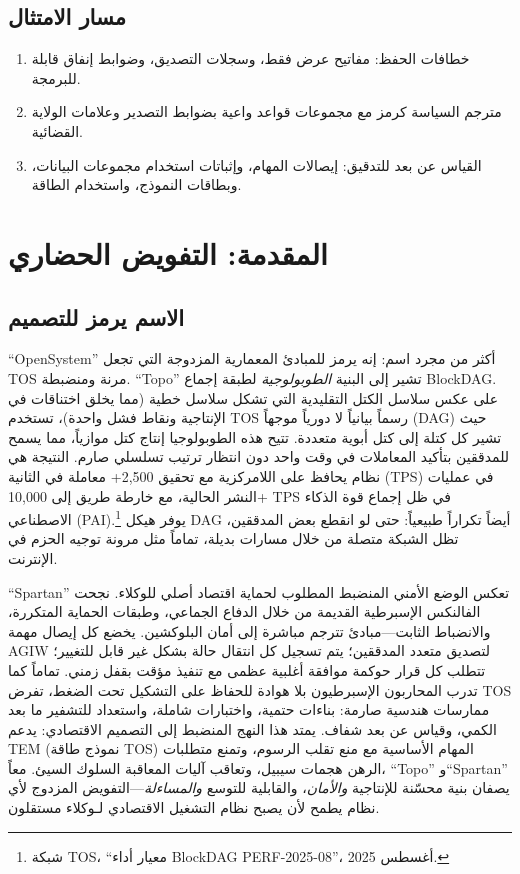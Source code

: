 \documentclass[11pt]{article}
\begin{document}
\subsection{مسار الامتثال}
\begin{enumerate}[noitemsep]
  \item خطافات الحفظ: مفاتيح عرض فقط، وسجلات التصديق، وضوابط إنفاق قابلة للبرمجة.
  \item مترجم السياسة كرمز مع مجموعات قواعد واعية بضوابط التصدير وعلامات الولاية القضائية.
  \item القياس عن بعد للتدقيق: إيصالات المهام، وإثباتات استخدام مجموعات البيانات، وبطاقات النموذج، واستخدام الطاقة.
\end{enumerate}

\section{المقدمة: التفويض الحضاري}
\subsection{الاسم يرمز للتصميم}
``OpenSystem'' أكثر من مجرد اسم: إنه يرمز للمبادئ المعمارية المزدوجة التي تجعل TOS مرنة ومنضبطة. ``Topo'' تشير إلى البنية \emph{الطوبولوجية} لطبقة إجماع BlockDAG. على عكس سلاسل الكتل التقليدية التي تشكل سلاسل خطية (مما يخلق اختناقات في الإنتاجية ونقاط فشل واحدة)، تستخدم TOS رسماً بيانياً لا دورياً موجهاً (DAG) حيث تشير كل كتلة إلى كتل أبوية متعددة. تتيح هذه الطوبولوجيا إنتاج كتل موازياً، مما يسمح للمدققين بتأكيد المعاملات في وقت واحد دون انتظار ترتيب تسلسلي صارم. النتيجة هي نظام يحافظ على اللامركزية مع تحقيق 2,500+ معاملة في الثانية (TPS) في عمليات النشر الحالية، مع خارطة طريق إلى 10,000+ TPS في ظل إجماع قوة الذكاء الاصطناعي (PAI).\footnote{شبكة TOS، ``معيار أداء BlockDAG PERF-2025-08''، أغسطس 2025.} يوفر هيكل DAG أيضاً تكراراً طبيعياً: حتى لو انقطع بعض المدققين، تظل الشبكة متصلة من خلال مسارات بديلة، تماماً مثل مرونة توجيه الحزم في الإنترنت.

``Spartan'' تعكس الوضع الأمني المنضبط المطلوب لحماية اقتصاد أصلي للوكلاء. نجحت الفالنكس الإسبرطية القديمة من خلال الدفاع الجماعي، وطبقات الحماية المتكررة، والانضباط الثابت---مبادئ تترجم مباشرة إلى أمان البلوكشين. يخضع كل إيصال مهمة AGIW لتصديق متعدد المدققين؛ يتم تسجيل كل انتقال حالة بشكل غير قابل للتغيير؛ تتطلب كل قرار حوكمة موافقة أغلبية عظمى مع تنفيذ مؤقت بقفل زمني. تماماً كما تدرب المحاربون الإسبرطيون بلا هوادة للحفاظ على التشكيل تحت الضغط، تفرض TOS ممارسات هندسية صارمة: بناءات حتمية، واختبارات شاملة، واستعداد للتشفير ما بعد الكمي، وقياس عن بعد شفاف. يمتد هذا النهج المنضبط إلى التصميم الاقتصادي: يدعم TEM (نموذج طاقة TOS) المهام الأساسية مع منع تقلب الرسوم، وتمنع متطلبات الرهن هجمات سيبيل، وتعاقب آليات المعاقبة السلوك السيئ. معاً، ``Topo'' و``Spartan'' يصفان بنية محسّنة للإنتاجية \emph{والأمان}، والقابلية للتوسع \emph{والمساءلة}---التفويض المزدوج لأي نظام يطمح لأن يصبح نظام التشغيل الاقتصادي لـوكلاء مستقلون.
\end{document}
